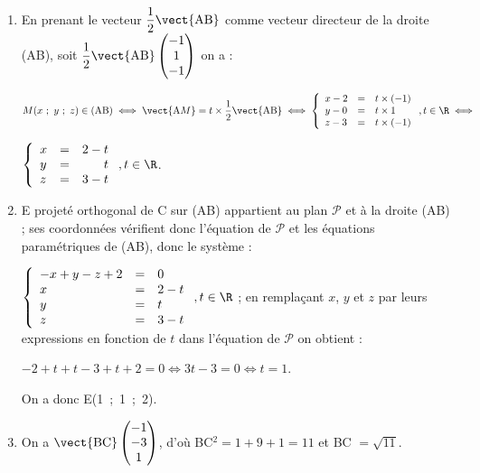 \begin{enumerate}
\begin{enumerate}
Avec $\vect{\text{C}M}\begin{pmatrix}x + 1\\y + 1\\z - 2\end{pmatrix}$, on obtient :

$-2(x + 1) + 2(y + 1) -2(z - 2) = 0 \iff -(x + 1) + (y + 1) - (z - 2) = 0 \iff - x + y - z + 2 = 0$.
		\item %
		En prenant le vecteur $\dfrac{1}{2}\vect{\text{AB}}$ comme vecteur directeur de la droite (AB), soit $\dfrac12\vect{\text{AB}}\begin{pmatrix}-1\\1\\-1\end{pmatrix}$ on a :
		
$M(x~;~y~;~z) \in (\text{AB}) \iff \vect{\text{A}M} = t\times \dfrac12\vect{\text{AB}} \iff \left\{\begin{array}{l c l}
x - 2&=&t \times (- 1)\\
y - 0 &=&t \times 1\\
z - 3&=&t \times (-1)
\end{array}\right., t \in \R \iff$

$ \left\{\begin{array}{l c r}
x &=& 2 - t\\
y &=&t \\
z &=& 3 - t 
\end{array}\right., t \in \R$.
		\item %
E projeté orthogonal de C sur (AB) appartient au plan $\mathcal{P}$ et à la droite (AB) ; ses coordonnées vérifient donc l'équation de $\mathcal{P}$ et les équations paramétriques de (AB), donc le système :

$\left\{\begin{array}{l c l}
- x + y - z + 2 &=& 0\\
x &=& 2 - t\\
y &=&t \\
z &=& 3 - t 
\end{array}\right., t \in \R$ ; en remplaçant $x$, $y$ et $z$ par leurs expressions en fonction de $t$ dans l'équation de $\mathcal{P}$ on obtient :

$- 2 + t  + t - 3 + t + 2 = 0\iff 3t - 3 = 0 \iff t = 1$.

On a donc E(1~;~1~;~2).
		\item %
On a $\vect{\text{BC}}\begin{pmatrix}-1\\-3\\1\end{pmatrix}$, d'où BC$^2 = 1 + 9 + 1 = 11$ et BC $ = \sqrt{11}$.
		

\end{enumerate}
\end{enumerate}
